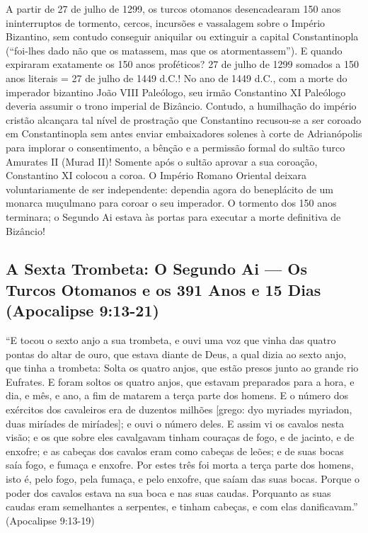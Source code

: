 \documentclass[11pt,a4paper,openany]{book}
\begin{document}
A partir de 27 de julho de 1299, os turcos otomanos desencadearam 150 anos ininterruptos de tormento, cercos, incursões e vassalagem sobre o Império Bizantino, sem contudo conseguir aniquilar ou extinguir a capital Constantinopla (``foi-lhes dado não que os matassem, mas que os atormentassem'').
E quando expiraram exatamente os 150 anos proféticos?
27 de julho de 1299 somados a 150 anos literais = 27 de julho de 1449 d.C.!
No ano de 1449 d.C., com a morte do imperador bizantino João VIII Paleólogo, seu irmão Constantino XI Paleólogo deveria assumir o trono imperial de Bizâncio. Contudo, a humilhação do império cristão alcançara tal nível de prostração que Constantino recusou-se a ser coroado em Constantinopla sem antes enviar embaixadores solenes à corte de Adrianópolis para implorar o consentimento, a bênção e a permissão formal do sultão turco Amurates II (Murad II)! Somente após o sultão aprovar a sua coroação, Constantino XI colocou a coroa. O Império Romano Oriental deixara voluntariamente de ser independente: dependia agora do beneplácito de um monarca muçulmano para coroar o seu imperador. O tormento dos 150 anos terminara; o Segundo Ai estava às portas para executar a morte definitiva de Bizâncio!



\subsection{A Sexta Trombeta: O Segundo Ai — Os Turcos Otomanos e os 391 Anos e 15 Dias (Apocalipse 9:13-21)}


``E tocou o sexto anjo a sua trombeta, e ouvi uma voz que vinha das quatro pontas do altar de ouro, que estava diante de Deus, a qual dizia ao sexto anjo, que tinha a trombeta: Solta os quatro anjos, que estão presos junto ao grande rio Eufrates. E foram soltos os quatro anjos, que estavam preparados para a hora, e dia, e mês, e ano, a fim de matarem a terça parte dos homens. E o número dos exércitos dos cavaleiros era de duzentos milhões [grego: dyo myriades myriadon, duas miríades de miríades]; e ouvi o número deles. E assim vi os cavalos nesta visão; e os que sobre eles cavalgavam tinham couraças de fogo, e de jacinto, e de enxofre; e as cabeças dos cavalos eram como cabeças de leões; e de suas bocas saía fogo, e fumaça e enxofre. Por estes três foi morta a terça parte dos homens, isto é, pelo fogo, pela fumaça, e pelo enxofre, que saíam das suas bocas. Porque o poder dos cavalos estava na sua boca e nas suas caudas. Porquanto as suas caudas eram semelhantes a serpentes, e tinham cabeças, e com elas danificavam.'' (Apocalipse 9:13-19)
\end{document}
